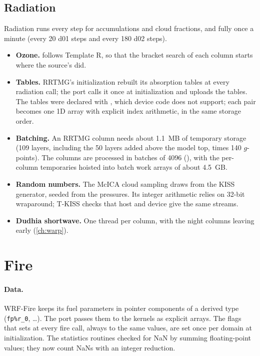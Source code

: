 \subsection{Radiation}

Radiation runs every step for accumulations and cloud fractions, and fully once a minute (every 20 d01 steps and every
180 d02 steps).
\begin{itemize}
  \item \textbf{Ozone.}  follows Template R, so that the bracket search of each column starts where
    the source's did.
  \item \textbf{Tables.} RRTMG's initialization rebuilt its absorption tables at every radiation call; the port calls
    it once at initialization and uploads the tables. The tables were declared with , which device
    code does not support; each pair becomes one 1D array with explicit index arithmetic, in the same storage order.
  \item \textbf{Batching.} An RRTMG column needs about 1.1~MB of temporary storage (109 layers, including the 50
    layers added above the model top, times 140 $g$-points). The columns are processed in batches of 4096
    (), with the per-column temporaries hoisted into batch work arrays of about 4.5~GB.
  \item \textbf{Random numbers.} The McICA cloud sampling draws from the KISS generator, seeded from the pressures.
    Its integer arithmetic relies on 32-bit wraparound; T-KISS checks that host and device give the same streams.
  \item \textbf{Dudhia shortwave.} One thread per column, with the night columns leaving early (\cref{ch:warp}).
\end{itemize}

\section{Fire}

\paragraph{Data.} WRF-Fire keeps its fuel parameters in pointer components of a derived type (\texttt{fp\%r\_0},
\dots). The port passes them to the kernels as explicit arrays. The flags that  sets at every fire
call, always to the same values, are set once per domain at initialization. The statistics routines checked for NaN
by summing floating-point values; they now count NaNs with an integer reduction.


